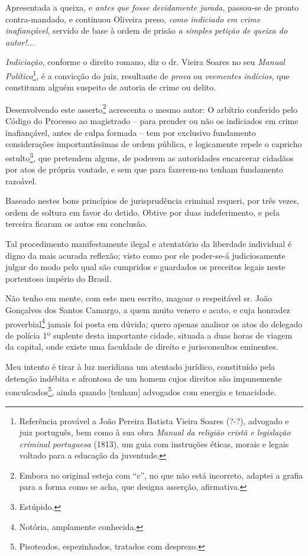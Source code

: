 Apresentada a queixa, e \emph{antes que fosse devidamente jurada},
passou-se de pronto contra-mandado, e continuou Oliveira preso,
\emph{como indiciado em crime inafiançável}, servido de base à ordem de
prisão \emph{a simples petição de queixa do autor!...}

\emph{Indiciação}, conforme o direito romano, diz o dr. Vieira Soares no
seu \emph{Manual Político}\footnote{ Referência provável a João Pereira
  Batista Vieira Soares (?-?), advogado e juiz português, bem como à sua
  obra \emph{Manual da religião cristã e legislação criminal portuguesa}
  (1813), um guia com instruções éticas, morais e legais voltado para a
  educação da juventude.}, é a convicção do juiz, resultante de
\emph{prova} ou \emph{veementes} \emph{indícios}, que constituam alguém
suspeito de autoria de crime ou delito.

Desenvolvendo este asserto\footnote{ Embora no original esteja com ``c'',
  no que não está incorreto, adaptei a grafia para a forma como se acha,
  que designa asserção, afirmativa.} acrescenta o mesmo autor: O
arbítrio conferido pelo Código do Processo ao magistrado -- para prender
ou não os indiciados em crime inafiançável, antes de culpa formada --
tem por exclusivo fundamento considerações importantíssimas de ordem
pública, e logicamente repele o capricho estulto\footnote{ Estúpido.},
que pretendem alguns, de poderem as autoridades encarcerar cidadãos por
atos de própria vontade, e sem que para fazerem-no tenham fundamento
razoável.

Baseado nestes bons princípios de jurisprudência criminal requeri, por
três vezes, ordem de soltura em favor do detido. Obtive por duas
indeferimento, e pela terceira ficaram os autos em conclusão.

Tal procedimento manifestamente ilegal e atentatório da liberdade
individual é digno da mais acurada reflexão; visto como por ele
poder-se-á judiciosamente julgar do modo pelo qual são cumpridos e
guardados os preceitos legais neste portentoso império do Brasil.

Não tenho em mente, com este meu escrito, magoar o respeitável sr. João
Gonçalves dos Santos Camargo, a quem muito venero e acato, e cuja
honradez proverbial\footnote{ Notória, amplamente conhecida.} jamais
foi posta em dúvida; quero apenas analisar os atos do delegado de
polícia 1º suplente desta importante cidade, situada a duas horas de
viagem da capital, onde existe uma faculdade de direito e jurisconsultos
eminentes.

Meu intento é tirar à luz meridiana um atentado jurídico, constituído
pela detenção indébita e afrontosa de um homem cujos direitos são
impunemente conculcados\footnote{ Pisoteados, espezinhados, tratados
  com desprezo.}, ainda quando {[}tenham{]} advogados com energia e
tenacidade.

